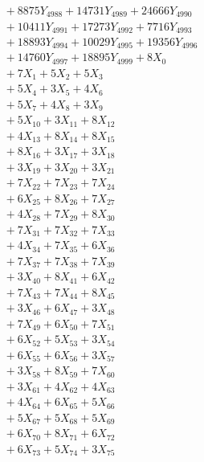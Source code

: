 \documentclass[a4paper,10pt]{article}
\begin{document}
{\begin{align}
&\;  + 8875 Y_{4988} + 14731 Y_{4989} + 24666 Y_{4990} \\[0.3ex]
&\;  + 10411 Y_{4991} + 17273 Y_{4992} + 7716 Y_{4993} \\[0.3ex]
&\;  + 18893 Y_{4994} + 10029 Y_{4995} + 19356 Y_{4996} \\[0.3ex]
&\;  + 14760 Y_{4997} + 18895 Y_{4999} + 8 X_{0} \\[0.3ex]
&\;  + 7 X_{1} + 5 X_{2} + 5 X_{3} \\[0.3ex]
&\;  + 5 X_{4} + 3 X_{5} + 4 X_{6} \\[0.3ex]
&\;  + 5 X_{7} + 4 X_{8} + 3 X_{9} \\[0.5ex]\allowbreak
&\;  + 5 X_{10} + 3 X_{11} + 8 X_{12} \\[0.3ex]
&\;  + 4 X_{13} + 8 X_{14} + 8 X_{15} \\[0.3ex]
&\;  + 8 X_{16} + 3 X_{17} + 3 X_{18} \\[0.3ex]
&\;  + 3 X_{19} + 3 X_{20} + 3 X_{21} \\[0.3ex]
&\;  + 7 X_{22} + 7 X_{23} + 7 X_{24} \\[0.3ex]
&\;  + 6 X_{25} + 8 X_{26} + 7 X_{27} \\[0.3ex]
&\;  + 4 X_{28} + 7 X_{29} + 8 X_{30} \\[0.3ex]
&\;  + 7 X_{31} + 7 X_{32} + 7 X_{33} \\[0.3ex]
&\;  + 4 X_{34} + 7 X_{35} + 6 X_{36} \\[0.3ex]
&\;  + 7 X_{37} + 7 X_{38} + 7 X_{39} \\[0.5ex]\allowbreak
&\;  + 3 X_{40} + 8 X_{41} + 6 X_{42} \\[0.3ex]
&\;  + 7 X_{43} + 7 X_{44} + 8 X_{45} \\[0.3ex]
&\;  + 3 X_{46} + 6 X_{47} + 3 X_{48} \\[0.3ex]
&\;  + 7 X_{49} + 6 X_{50} + 7 X_{51} \\[0.3ex]
&\;  + 6 X_{52} + 5 X_{53} + 3 X_{54} \\[0.3ex]
&\;  + 6 X_{55} + 6 X_{56} + 3 X_{57} \\[0.3ex]
&\;  + 3 X_{58} + 8 X_{59} + 7 X_{60} \\[0.3ex]
&\;  + 3 X_{61} + 4 X_{62} + 4 X_{63} \\[0.3ex]
&\;  + 4 X_{64} + 6 X_{65} + 5 X_{66} \\[0.3ex]
&\;  + 5 X_{67} + 5 X_{68} + 5 X_{69} \\[0.5ex]\allowbreak
&\;  + 6 X_{70} + 8 X_{71} + 6 X_{72} \\[0.3ex]
&\;  + 6 X_{73} + 5 X_{74} + 3 X_{75} \\[0.3ex]

\end{align}}
\end{document}
